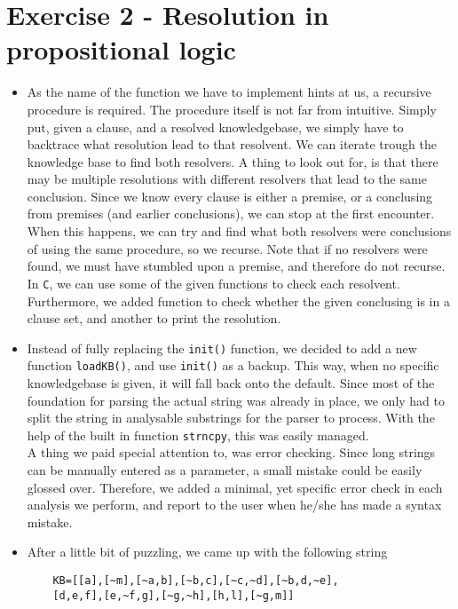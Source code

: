 \documentclass{report}
\begin{document}
\section*{Exercise 2 - Resolution in propositional logic}
\begin{itemize}
    \item As the name of the function we have to implement hints at us, a recursive procedure is required. The procedure itself is not far from intuitive. Simply put, given a clause, and a resolved knowledgebase, we simply have to backtrace what resolution lead to that resolvent. We can iterate trough the knowledge base to find both resolvers. A thing to look out for, is that there may be multiple resolutions with different resolvers that lead to the same conclusion. Since we know every clause is either a premise, or a conclusing from premises (and earlier conclusions), we can stop at the first encounter. When this happens, we can try and find what both resolvers were conclusions of using the same procedure, so we recurse. Note that if no resolvers were found, we must have stumbled upon a premise, and therefore do not recurse.\\
    In \verb|C|, we can use some of the given functions to check each resolvent. Furthermore, we added function to check whether the given conclusing is in a clause set, and another to print the resolution.
    \item Instead of fully replacing the \verb|init()| function, we decided to add a new function \verb|loadKB()|, and use \verb|init()| as a backup. This way, when no specific knowledgebase is given, it will fall back onto the default. Since most of the foundation for parsing the actual string was already in place, we only had to split the string in analysable substrings for the parser to process. With the help of the built in function \verb|strncpy|, this was easily managed.\\
    A thing we paid special attention to, was error checking. Since long strings can be manually entered as a parameter, a small mistake could be easily glossed over. Therefore, we added a minimal, yet specific error check in each analysis we perform, and report to the user when he/she has made a syntax mistake.\\
    \item After a little bit of puzzling, we came up with the following string\\
    \begin{verbatim}
    KB=[[a],[~m],[~a,b],[~b,c],[~c,~d],[~b,d,~e],
    [d,e,f],[e,~f,g],[~g,~h],[h,l],[~g,m]]

\end{verbatim}
\end{itemize}
\end{document}
